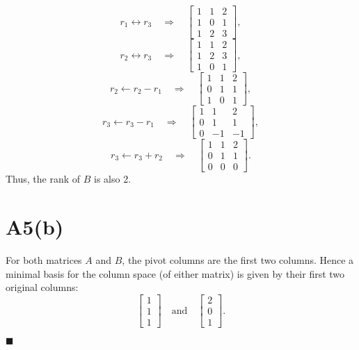 \documentclass{article}
\begin{document}
\[
r_1 \leftrightarrow r_3 
\quad\Longrightarrow\quad
\begin{bmatrix}
1 & 1 & 2\\
1 & 0 & 1\\
1 & 2 & 3
\end{bmatrix},
\]
\[
r_2\leftrightarrow r_3 
\quad\Longrightarrow\quad
\begin{bmatrix}
1 & 1 & 2\\
1 & 2 & 3\\
1 & 0 & 1
\end{bmatrix},
\]
\[
r_2 \leftarrow r_2 - r_1
\quad\Longrightarrow\quad
\begin{bmatrix}
1 & 1 & 2\\
0 & 1 & 1\\
1 & 0 & 1
\end{bmatrix},
\]
\[
r_3 \leftarrow r_3 - r_1
\quad\Longrightarrow\quad
\begin{bmatrix}
1 & 1 & 2\\
0 & 1 & 1\\
0 & -1 & -1
\end{bmatrix},
\]
\[
r_3 \leftarrow r_3 + r_2
\quad\Longrightarrow\quad
\begin{bmatrix}
1 & 1 & 2\\
0 & 1 & 1\\
0 & 0 & 0
\end{bmatrix}.
\]
Thus, the rank of \(B\) is also 2.

\section*{A5(b)}
For both matrices \(A\) and \(B\), the pivot columns are the first two columns. Hence a minimal basis for the column space (of either matrix) is given by their first two original columns:
\[
\begin{bmatrix}
1\\
1\\
1
\end{bmatrix}
\quad\text{and}\quad
\begin{bmatrix}
2\\
0\\
1
\end{bmatrix}.
\]

\hfill\(\blacksquare\)
\end{document}

